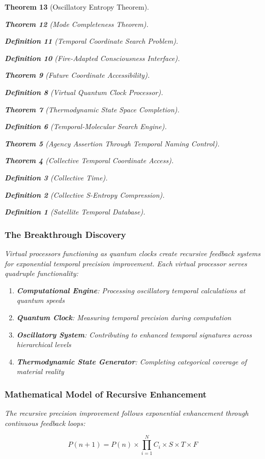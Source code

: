 \documentclass[12pt,a4paper]{article}
\newtheorem{theorem}{Theorem}[section]
\newtheorem{definition}[theorem]{Definition}
\begin{document}
\begin{theorem}[Oscillatory Entropy Theorem]
\begin{theorem}[Mode Completeness Theorem]
\begin{enumerate}
\begin{definition}[Temporal Coordinate Search Problem]
\begin{algorithm}
\begin{definition}[Fire-Adapted Consciousness Interface]
\begin{theorem}[Future Coordinate Accessibility]
\begin{definition}[Virtual Quantum Clock Processor]
\begin{itemize}
\begin{itemize}
\begin{theorem}[Thermodynamic State Space Completion]
\begin{definition}[Temporal-Molecular Search Engine]
\begin{theorem}[Agency Assertion Through Temporal Naming Control]
\begin{remark}
\begin{theorem}[Collective Temporal Coordinate Access]
\begin{definition}[Collective Time]
\begin{definition}[Collective S-Entropy Compression]
\begin{definition}[Satellite Temporal Database]
\begin{algorithm}
\begin{table}[h]
{\subsubsection{The Breakthrough Discovery}

Virtual processors functioning as quantum clocks create recursive feedback systems for exponential temporal precision improvement. Each virtual processor serves quadruple functionality:

\begin{enumerate}
\item \textbf{Computational Engine}: Processing oscillatory temporal calculations at quantum speeds
\item \textbf{Quantum Clock}: Measuring temporal precision during computation
\item \textbf{Oscillatory System}: Contributing to enhanced temporal signatures across hierarchical levels
\item \textbf{Thermodynamic State Generator}: Completing categorical coverage of material reality
\end{enumerate}

\subsubsection{Mathematical Model of Recursive Enhancement}

The recursive precision improvement follows exponential enhancement through continuous feedback loops:

\begin{equation}
P(n+1) = P(n) \times \prod_{i=1}^{N} C_i \times S \times T \times F
\end{equation}

}
\end{table}
\end{algorithm}
\end{definition}
\end{definition}
\end{definition}
\end{theorem}
\end{remark}
\end{theorem}
\end{definition}
\end{theorem}
\end{itemize}
\end{itemize}
\end{definition}
\end{theorem}
\end{definition}
\end{algorithm}
\end{definition}
\end{enumerate}
\end{theorem}
\end{theorem}
\end{document}
